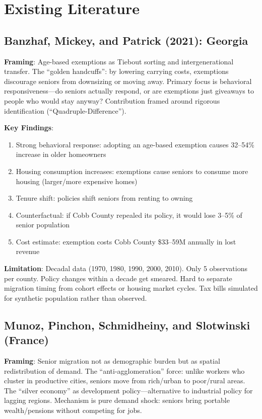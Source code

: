 \documentclass[11pt]{article}
\begin{document}
\section{Existing Literature}

\subsection{Banzhaf, Mickey, and Patrick (2021): Georgia}

\textbf{Framing}: Age-based exemptions as Tiebout sorting and intergenerational transfer. The ``golden handcuffs'': by lowering carrying costs, exemptions discourage seniors from downsizing or moving away. Primary focus is behavioral responsiveness---do seniors actually respond, or are exemptions just giveaways to people who would stay anyway? Contribution framed around rigorous identification (``Quadruple-Difference'').

\textbf{Key Findings}:
\begin{enumerate}
    \item Strong behavioral response: adopting an age-based exemption causes 32--54\% increase in older homeowners
    \item Housing consumption increases: exemptions cause seniors to consume more housing (larger/more expensive homes)
    \item Tenure shift: policies shift seniors from renting to owning
    \item Counterfactual: if Cobb County repealed its policy, it would lose 3--5\% of senior population
    \item Cost estimate: exemption costs Cobb County \$33--59M annually in lost revenue
\end{enumerate}

\textbf{Limitation}: Decadal data (1970, 1980, 1990, 2000, 2010). Only 5 observations per county. Policy changes within a decade get smeared. Hard to separate migration timing from cohort effects or housing market cycles. Tax bills simulated for synthetic population rather than observed.

\subsection{Munoz, Pinchon, Schmidheiny, and Slotwinski (France)}

\textbf{Framing}: Senior migration not as demographic burden but as spatial redistribution of demand. The ``anti-agglomeration'' force: unlike workers who cluster in productive cities, seniors move from rich/urban to poor/rural areas. The ``silver economy'' as development policy---alternative to industrial policy for lagging regions. Mechanism is pure demand shock: seniors bring portable wealth/pensions without competing for jobs.
\end{document}
